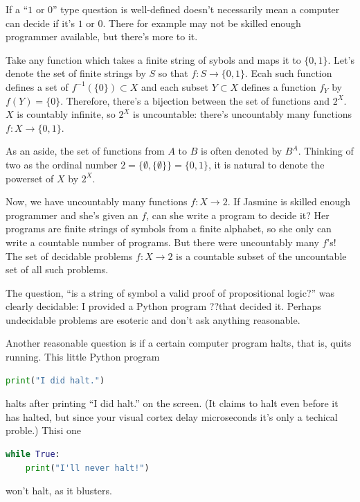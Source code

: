 \documentclass[11pt,oneside,%
]{memoir}
\theoremstyle{definition}
\begin{document}
If a ``\(1\) or \(0\)'' type question is well-defined doesn't necessarily mean a computer can decide if it's \(1\) or \(0\). There for example may not be skilled enough programmer available, but there's more to it.

Take any function which takes a finite string of sybols and maps it to \(\lbrace0,1\rbrace\). Let's denote the set of finite strings by \(S\) so that \(f:S\rightarrow\lbrace0,1\rbrace\). Ecah such function defines a set of \(f^{-1}(\lbrace0\rbrace)\subset X\) and each subset \(Y\subset X\) defines a function \(f_Y\) by \(f(Y)=\lbrace0\rbrace\). Therefore, there's a bijection between the set of functions and \(2^X\). \(X\) is countably infinite, so \(2^X\) is uncountable: there's uncountably many functions \(f:X\rightarrow\lbrace0,1\rbrace\).

As an aside, the set of functions from \(A\) to \(B\) is often denoted by \(B^A\). Thinking of two as the ordinal number \(2=\lbrace\emptyset,\lbrace\emptyset\rbrace\rbrace=\lbrace0,1\rbrace\), it is natural to denote the powerset of \(X\) by \(2^X\).

Now, we have uncountably many functions \(f:X\rightarrow 2\). If Jasmine is skilled enough programmer and she's given an \(f\), can she write a program to decide it? Her programs are finite strings of symbols from a finite alphabet, so she only can write a countable number of programs. But there were uncountably many \(f\)'s! The set of decidable problems \(f:X\rightarrow2\) is a countable subset of the uncountable set of all such problems.

The question, ``is a string of symbol a valid proof of propositional logic?'' was clearly decidable: I provided a Python program ??that decided it. Perhaps undecidable problems are esoteric and don't ask anything reasonable.

Another reasonable question is if a certain computer program halts, that is, quits running. This little Python program
\begin{lstlisting}[language=python]
print("I did halt.")
\end{lstlisting}
halts after printing ``I did halt.'' on the screen. (It claims to halt even before it has halted, but since your visual cortex delay microseconds it's only a techical proble.) Thisi one
\begin{lstlisting}[language=python]
while True:
    print("I'll never halt!")
\end{lstlisting}
won't halt, as it blusters.
\end{document}
